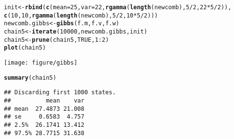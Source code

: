 \documentclass{article}\usepackage[]{graphicx}\usepackage[]{color}
\makeatletter
\def\maxwidth{ %
  \ifdim\Gin@nat@width>\linewidth
    \linewidth
  \else
    \Gin@nat@width
  \fi
}
\newcommand{\hlnum}[1]{\textcolor[rgb]{0.686,0.059,0.569}{#1}}%
\newcommand{\hlopt}[1]{\textcolor[rgb]{0,0,0}{#1}}%
\newcommand{\hlstd}[1]{\textcolor[rgb]{0.345,0.345,0.345}{#1}}%
\newcommand{\hlkwb}[1]{\textcolor[rgb]{0.69,0.353,0.396}{#1}}%
\newcommand{\hlkwc}[1]{\textcolor[rgb]{0.333,0.667,0.333}{#1}}%
\newcommand{\hlkwd}[1]{\textcolor[rgb]{0.737,0.353,0.396}{\textbf{#1}}}%
\newenvironment{kframe}{%
 \def\at@end@of@kframe{}%
 \ifinner\ifhmode%
  \def\at@end@of@kframe{\end{minipage}}%
  \begin{minipage}{\columnwidth}%
 \fi\fi%
 \def\FrameCommand##1{\hskip\@totalleftmargin \hskip-\fboxsep
 \colorbox{shadecolor}{##1}\hskip-\fboxsep
     \hskip-\linewidth \hskip-\@totalleftmargin \hskip\columnwidth}%
 \MakeFramed {\advance\hsize-\width
   \@totalleftmargin\z@ \linewidth\hsize
   \@setminipage}}%
 {\par\unskip\endMakeFramed%
 \at@end@of@kframe}
\newenvironment{knitrout}{}{} %
\makeatother
\begin{document}
\begin{knitrout}
\color{fgcolor}\begin{kframe}
\begin{alltt}
\hlstd{init} \hlkwb{<-} \hlkwd{rbind}\hlstd{(}\hlkwd{c}\hlstd{(}\hlkwc{mean} \hlstd{=} \hlnum{25}\hlstd{,} \hlkwc{var} \hlstd{=} \hlnum{22}\hlstd{,} \hlkwd{rgamma}\hlstd{(}\hlkwd{length}\hlstd{(newcomb),} \hlnum{5}\hlopt{/}\hlnum{2}\hlstd{,} \hlnum{22} \hlopt{*} \hlnum{5}\hlopt{/}\hlnum{2}\hlstd{)),}
    \hlkwd{c}\hlstd{(}\hlnum{10}\hlstd{,} \hlnum{10}\hlstd{,} \hlkwd{rgamma}\hlstd{(}\hlkwd{length}\hlstd{(newcomb),} \hlnum{5}\hlopt{/}\hlnum{2}\hlstd{,} \hlnum{10} \hlopt{*} \hlnum{5}\hlopt{/}\hlnum{2}\hlstd{)))}
\hlstd{newcomb.gibbs} \hlkwb{<-} \hlkwd{gibbs}\hlstd{(f.m, f.v, f.w)}
\hlstd{chain5} \hlkwb{<-} \hlkwd{iterate}\hlstd{(}\hlnum{10000}\hlstd{, newcomb.gibbs, init)}
\hlstd{chain5} \hlkwb{<-} \hlkwd{prune}\hlstd{(chain5,} \hlnum{TRUE}\hlstd{,} \hlnum{1}\hlopt{:}\hlnum{2}\hlstd{)}
\hlkwd{plot}\hlstd{(chain5)}
\end{alltt}
\end{kframe}
\texttt{[image: figure/gibbs]} 
\begin{kframe}\begin{alltt}
\hlkwd{summary}\hlstd{(chain5)}
\end{alltt}
\begin{verbatim}
## Discarding first 1000 states.
##          mean    var
## mean  27.4873 21.008
## se     0.6583  4.757
## 2.5%  26.1741 13.412
## 97.5% 28.7715 31.638
\end{verbatim}
\end{kframe}
\end{knitrout}
\end{document}
